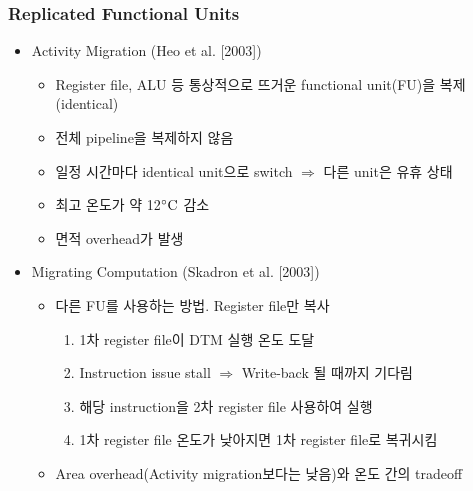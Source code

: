 \subsubsection*{Replicated Functional Units}
\begin{itemize}
    \item Activity Migration (Heo et al. [2003])
    \begin{itemize}
        \item Register file, ALU 등 통상적으로 뜨거운 functional unit(FU)을 복제 (identical)
        \item 전체 pipeline을 복제하지 않음
        \item 일정 시간마다 identical unit으로 switch $\Rightarrow$ 다른 unit은 유휴 상태
        \item 최고 온도가 약 12$^{\circ}\mathrm{C}$ 감소
        \item 면적 overhead가 발생
    \end{itemize}
    \newpage
    \item Migrating Computation (Skadron et al. [2003])
    \begin{itemize}
        \item 다른 FU를 사용하는 방법. Register file만 복사
        \begin{enumerate}
            \item 1차 register file이 DTM 실행 온도 도달
            \item Instruction issue stall $\Rightarrow$ Write-back 될 때까지 기다림
            \item 해당 instruction을 2차 register file 사용하여 실행
            \item 1차 register file 온도가 낮아지면 1차 register file로 복귀시킴
        \end{enumerate}
        \item Area overhead(Activity migration보다는 낮음)와 온도 간의 tradeoff
    \end{itemize}
\end{itemize}

